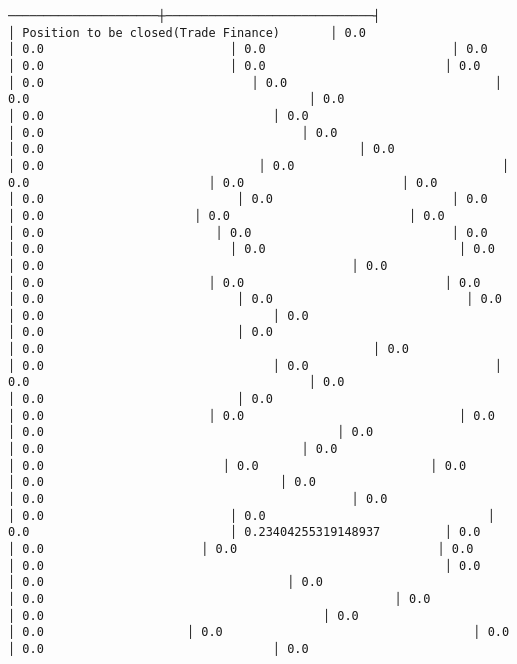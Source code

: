 \documentclass[11pt]{article}
\begin{document}
\begin{Verbatim}[commandchars=\\\{\}]
─────────────────────┼─────────────────────────────┤
│ Position to be closed(Trade Finance)       │ 0.0                                      │ 0.0                          │ 0.0                          │ 0.0                          │ 0.0                          │ 0.0                         │ 0.0                         │ 0.0                             │ 0.0                             │ 0.0                                       │ 0.0                                  │ 0.0                                │ 0.0                                         │ 0.0                                    │ 0.0                                    │ 0.0                                            │ 0.0                             │ 0.0                              │ 0.0                             │ 0.0                         │ 0.0                      │ 0.0                                │ 0.0                           │ 0.0                         │ 0.0                      │ 0.0                     │ 0.0                         │ 0.0                                  │ 0.0                        │ 0.0                            │ 0.0                           │ 0.0                          │ 0.0                           │ 0.0                                            │ 0.0                                           │ 0.0                      │ 0.0                       │ 0.0                            │ 0.0                                │ 0.0                           │ 0.0                           │ 0.0                          │ 0.0                                │ 0.0                            │ 0.0                           │ 0.0                                         │ 0.0                                              │ 0.0                           │ 0.0                                │ 0.0                          │ 0.0                                       │ 0.0                          │ 0.0                           │ 0.0                                     │ 0.0                       │ 0.0                              │ 0.0                                     │ 0.0                                         │ 0.0                                         │ 0.0                                    │ 0.0                                │ 0.0                         │ 0.0                        │ 0.0                              │ 0.0                                 │ 0.0                            │ 0.0                                           │ 0.0                            │ 0.0                          │ 0.0                               │ 0.0                            │ 0.23404255319148937         │ 0.0                     │ 0.0                      │ 0.0                            │ 0.0                                   │ 0.0                                                        │ 0.0                                       │ 0.0                                  │ 0.0                                │ 0.0                                                 │ 0.0                                       │ 0.0                                       │ 0.0                                │ 0.0                    │ 0.0                                   │ 0.0                                  │ 0.0                                │ 0.0                      
\end{Verbatim}
\end{document}
